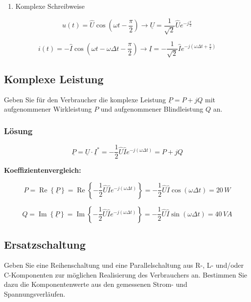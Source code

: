 \documentclass[
  ngerman,
  letterpaper,
]{scrbook}
\providecommand{\tightlist}{%
  \setlength{\itemsep}{0pt}\setlength{\parskip}{0pt}}
\begin{document}
\begin{enumerate}
\def\labelenumi{\arabic{enumi}.}
\setcounter{enumi}{1}
\tightlist
\item
  Komplexe Schreibweise
\end{enumerate}

\[
u(t) = \hat{U} \cos\left(\omega t - \frac{\pi}{2} \right) \rightarrow \underline{U}
= \frac{1}{\sqrt{2}} \hat{U}e^{-j\frac{\pi}{2}} 
\]

\[
i(t) = -\hat{I} \cos\left(\omega t- \omega\Delta t -\frac{\pi}{2}\right) \rightarrow \underline{I} 
= -\frac{1}{\sqrt{2}}\hat{I} e^{-j(\omega \Delta t + \frac{\pi}{2})}
\]

\subsection{Komplexe Leistung}\label{komplexe-leistung-1}

Geben Sie für den Verbraucher die komplexe Leistung
\(\underline{P}=P+jQ\) mit aufgenommener Wirkleistung \(P\) und
aufgenommener Blindleistung \(Q\) an.

\subsubsection{Lösung}\label{luxf6sung-13}

\[
\underline{P} = \underline{U} \cdot \underline{I}^* = -\frac{1}{2} \hat{U} \hat{I} e^{-j(\omega \Delta t)} = P + j Q
\]

\textbf{Koeffizientenvergleich:}

\[
P = \operatorname{Re}\left\{\underline{P}\right\} 
= \operatorname{Re}\left\{-\frac{1}{2} \hat{U} \hat{I}e^{-j(\omega \Delta t)}\right\} 
= -\frac{1}{2} \hat{U} \hat{I}\cos(\omega \Delta t) = 20\,W
\]

\[
Q = \operatorname{Im}\left\{\underline{P}\right\} 
= \operatorname{Im}\left\{-\frac{1}{2} \hat{U} \hat{I}e^{-j(\omega\Delta t)}\right\}
= -\frac{1}{2} \hat{U} \hat{I}\sin(\omega \Delta t) = 40\,VA
\]

\subsection{Ersatzschaltung}\label{ersatzschaltung}

Geben Sie eine Reihenschaltung und eine Parallelschaltung aus R-, L-
und/oder C-Komponenten zur möglichen Realisierung des Verbrauchers an.
Bestimmen Sie dazu die Komponentenwerte aus den gemessenen Strom- und
Spannungsverläufen.
\end{document}
